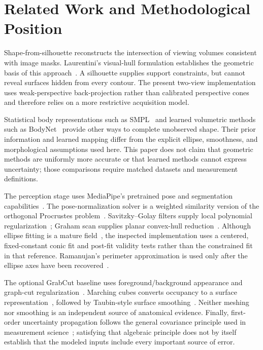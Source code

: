 \documentclass[11pt,a4paper]{article}
\numberwithin{equation}{section}
\begin{document}
\section{Related Work and Methodological Position}
Shape-from-silhouette reconstructs the intersection of viewing volumes consistent with image masks. Laurentini's visual-hull formulation establishes the geometric basis of this approach~\cite{laurentini1994visual}. A silhouette supplies support constraints, but cannot reveal surfaces hidden from every contour. The present two-view implementation uses weak-perspective back-projection rather than calibrated perspective cones and therefore relies on a more restrictive acquisition model.

Statistical body representations such as SMPL~\cite{loper2015smpl} and learned volumetric methods such as BodyNet~\cite{varol2018bodynet} provide other ways to complete unobserved shape. Their prior information and learned mapping differ from the explicit ellipse, smoothness, and morphological assumptions used here. This paper does not claim that geometric methods are uniformly more accurate or that learned methods cannot express uncertainty; those comparisons require matched datasets and measurement definitions.

The perception stage uses MediaPipe's pretrained pose and segmentation capabilities~\cite{lugaresi2019mediapipe,mediapipeguide}. The pose-normalization solver is a weighted similarity version of the orthogonal Procrustes problem~\cite{schonemann1966generalized}. Savitzky--Golay filters supply local polynomial regularization~\cite{savitzky1964smoothing}; Graham scan supplies planar convex-hull reduction~\cite{graham1972efficient}. Although ellipse fitting is a mature field~\cite{fitzgibbon1999direct}, the inspected implementation uses a centered, fixed-constant conic fit and post-fit validity tests rather than the constrained fit in that reference. Ramanujan's perimeter approximation is used only after the ellipse axes have been recovered~\cite{ramanujan1914modular}.

The optional GrabCut baseline uses foreground/background appearance and graph-cut regularization~\cite{rother2004grabcut}. Marching cubes converts occupancy to a surface representation~\cite{lorensen1987marching}, followed by Taubin-style surface smoothing~\cite{taubin1995signal}. Neither meshing nor smoothing is an independent source of anatomical evidence. Finally, first-order uncertainty propagation follows the general covariance principle used in measurement science~\cite{jcgm2008}; satisfying that algebraic principle does not by itself establish that the modeled inputs include every important source of error.
\end{document}
